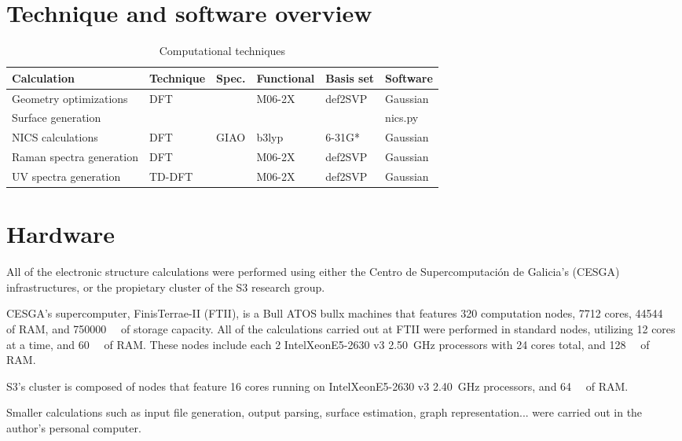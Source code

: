 \section{Technique and software overview}

\begin{table*}[h]
    \centering
    \caption{Computational techniques}
    \begin{tabular}{@{}llllll@{}}
        \toprule
        Calculation & Technique & Spec. & Functional & Basis set & Software \\
        \midrule
        Geometry optimizations & DFT & & M06-2X & def2SVP & Gaussian \\
        Surface generation & & & & & nics.py \\
        NICS calculations & DFT & GIAO & b3lyp & 6-31G* & Gaussian \\
        Raman spectra generation & DFT & & M06-2X & def2SVP & Gaussian \\
        UV spectra generation & TD-DFT & & M06-2X & def2SVP & Gaussian \\
        \bottomrule
    \end{tabular}
\end{table*}


\section{Hardware}
All of the electronic structure calculations were performed using either the Centro de Supercomputación de Galicia's (CESGA) infrastructures, or the propietary cluster of the S3 research group.

CESGA's supercomputer, FinisTerrae-II (FTII), is a Bull ATOS bullx machines that features \num{320} computation nodes, \num{7712} cores, \SI{44544}{\giga\byte} of RAM, and \SI{750000}{\giga\byte} of storage capacity.
All of the calculations carried out at FTII were performed in standard nodes, utilizing \num{12} cores at a time, and \SI{60}{\giga\byte} of RAM.
These nodes include each 2 Intel\textregistered Xeon\textregistered E5-2630 v3 \SI{2.50}{\giga\hertz} processors with \num{24} cores total, and \SI{128}{\giga\byte} of RAM.

S3's cluster is composed of nodes that feature \num{16} cores running on Intel\textregistered Xeon\textregistered E5-2630 v3 \SI{2.40}{\giga\hertz} processors, and \SI{64}{\giga\byte} of RAM.

Smaller calculations such as input file generation, output parsing, surface estimation, graph representation... were carried out in the author's personal computer.
